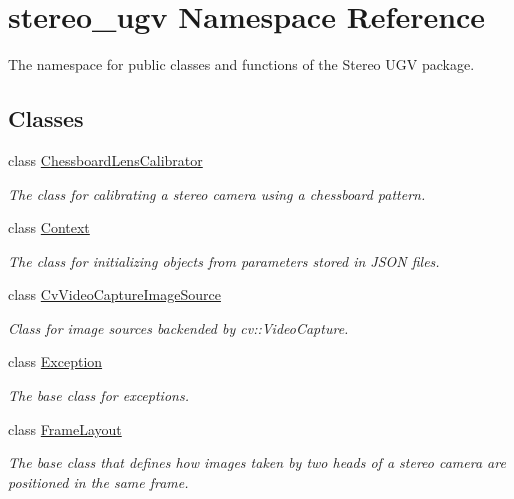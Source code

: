 \hypertarget{namespacestereo__ugv}{}\section{stereo\+\_\+ugv Namespace Reference}
\label{namespacestereo__ugv}


The namespace for public classes and functions of the Stereo U\+GV package.  


\subsection*{Classes}
\begin{DoxyCompactItemize}
\item 
class \hyperlink{classstereo__ugv_1_1ChessboardLensCalibrator}{Chessboard\+Lens\+Calibrator}
\begin{DoxyCompactList}\small\item\em The class for calibrating a stereo camera using a chessboard pattern. \end{DoxyCompactList}\item 
class \hyperlink{classstereo__ugv_1_1Context}{Context}
\begin{DoxyCompactList}\small\item\em The class for initializing objects from parameters stored in J\+S\+ON files. \end{DoxyCompactList}\item 
class \hyperlink{classstereo__ugv_1_1CvVideoCaptureImageSource}{Cv\+Video\+Capture\+Image\+Source}
\begin{DoxyCompactList}\small\item\em Class for image sources backended by cv\+::\+Video\+Capture. \end{DoxyCompactList}\item 
class \hyperlink{classstereo__ugv_1_1Exception}{Exception}
\begin{DoxyCompactList}\small\item\em The base class for exceptions. \end{DoxyCompactList}\item 
class \hyperlink{classstereo__ugv_1_1FrameLayout}{Frame\+Layout}
\begin{DoxyCompactList}\small\item\em The base class that defines how images taken by two heads of a stereo camera are positioned in the same frame. \end{DoxyCompactList}\item 

\end{DoxyCompactItemize}
